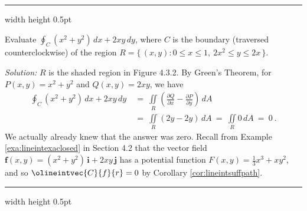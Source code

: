 \vspace{3mm}
\hrule width \textwidth height 0.5pt
\begin{exa}\label{exa:greenexa}
  Evaluate $\oint_{C} (x^2 + y^2 )\,dx + 2xy\,dy$, where $C$ is the boundary (traversed counterclockwise) of the region
  $R = \lbrace\,(x,y): 0 \le x \le 1,~2x^2 \le y \le 2x \,\rbrace$.\vspace{-1mm}

 \piccaption[]{}
 \par\noindent \emph{Solution:} $R$ is the shaded region in Figure 4.3.2. By Green's Theorem, for
 $P(x,y)=x^2 + y^2$ and $Q(x,y)=2xy$, we have
 \begin{align*}
  \oint_C (x^2 + y^2 )\,dx + 2xy\,dy ~&=~ \iint\limits_{R} \left( \frac{\partial Q}{\partial x} -
   \frac{\partial P}{\partial y} \right)\,dA\\
   &=~ \iint\limits_{R} (2y - 2y)\,dA
   ~=~ \iint\limits_{R} 0\,dA ~=~ 0 ~.
 \end{align*}\vspace{-14mm}
 We actually already knew that the answer was zero. Recall from Example
 \ref{exa:lineintexaclosed} in Section 4.2 that the vector field
 $\textbf{f}(x,y) = ( x^2 + y^2 )\,\textbf{i} + 2xy\,\textbf{j}$ has a potential function
 $F(x,y)=\frac{1}{3}x^3 + xy^2$, and so $\olineintvec{C}{f}{r} = 0$ by Corollary \ref{cor:lineintsuffpath}.
 \end{exa}
\hrule width \textwidth height 0.5pt
